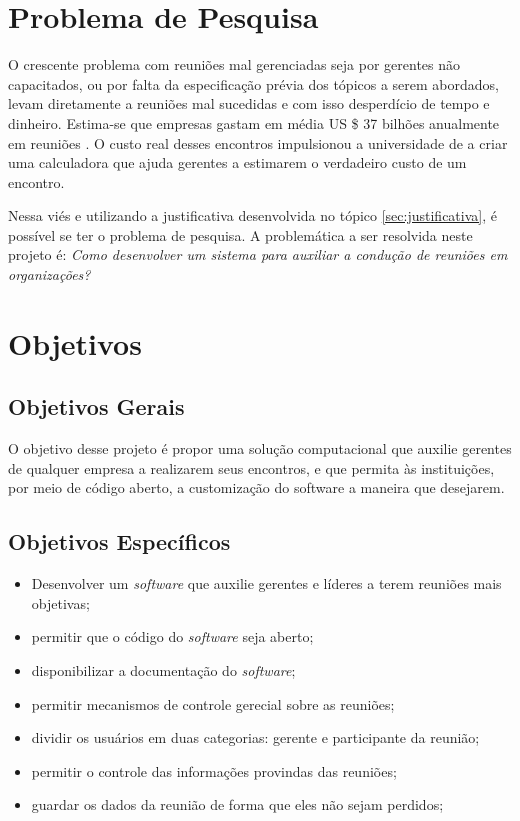 \section{Problema de Pesquisa}
\label{sec:problema_de_pesquisa}

O crescente problema com reuniões mal gerenciadas seja por gerentes não capacitados, ou por falta da especificação prévia dos tópicos a serem abordados, levam diretamente a reuniões mal sucedidas e com isso desperdício de tempo e dinheiro. Estima-se que empresas gastam em média US \$ 37 bilhões anualmente em reuniões . O custo real desses encontros impulsionou a universidade de  a criar uma calculadora que ajuda gerentes a estimarem o verdadeiro custo de um encontro.

Nessa viés e utilizando a justificativa desenvolvida no tópico \ref{sec:justificativa}, é possível se ter o problema de pesquisa. A problemática a ser resolvida neste projeto é: \textit{Como desenvolver um sistema para auxiliar a condução de reuniões em organizações?}

\section{Objetivos}
\label{sec:objetivos}

\subsection{Objetivos Gerais}
\label{sec:objetivos_gerais}

O objetivo desse projeto é propor uma solução computacional que auxilie gerentes de qualquer empresa a realizarem seus encontros, e que permita às instituições, por meio de código aberto, a customização do software a maneira que desejarem. 

\subsection{Objetivos Específicos}
\label{sec:objetivos_especificos}

\begin{itemize}
    \item Desenvolver um \textit{software} que auxilie gerentes e líderes a terem reuniões mais objetivas;
    \item permitir que o código do \textit{software} seja aberto;
    \item disponibilizar a documentação do \textit{software};
    \item permitir mecanismos de controle gerecial sobre as reuniões;
    \item dividir os usuários em duas categorias: gerente e participante da reunião;
    \item permitir o controle das informações provindas das reuniões;
    \item guardar os dados da reunião de forma que eles não sejam perdidos;
\end{itemize}